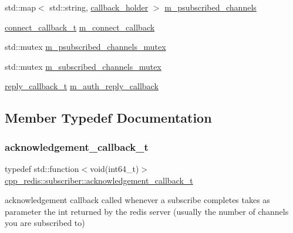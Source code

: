 \begin{DoxyCompactItemize}
\item 
std\+::map$<$ std\+::string, \hyperlink{structcpp__redis_1_1subscriber_1_1callback__holder}{callback\+\_\+holder} $>$ \hyperlink{classcpp__redis_1_1subscriber_a5fa674196428e6f41f808a2f9ff7ec39}{m\+\_\+psubscribed\+\_\+channels}
\item 
\hyperlink{classcpp__redis_1_1subscriber_a90f2f7d4c748c3c2e89d1e977fa6dce1}{connect\+\_\+callback\+\_\+t} \hyperlink{classcpp__redis_1_1subscriber_a39521d60ac80bc449567125e3c509a60}{m\+\_\+connect\+\_\+callback}
\item 
std\+::mutex \hyperlink{classcpp__redis_1_1subscriber_ac2841588b66c32f9cf306672013f3300}{m\+\_\+psubscribed\+\_\+channels\+\_\+mutex}
\item 
std\+::mutex \hyperlink{classcpp__redis_1_1subscriber_ae46b99f9ff06e2a05daca6273ffbb155}{m\+\_\+subscribed\+\_\+channels\+\_\+mutex}
\item 
\hyperlink{classcpp__redis_1_1subscriber_a99d220cc662664e2399b709f61ac9581}{reply\+\_\+callback\+\_\+t} \hyperlink{classcpp__redis_1_1subscriber_a045f1c4e84a7384565deb2d8e7023dfd}{m\+\_\+auth\+\_\+reply\+\_\+callback}
\end{DoxyCompactItemize}


\subsection{Member Typedef Documentation}
\mbox{\label{classcpp__redis_1_1subscriber_a19ea39dfabeb19937a9ce4c8d21781b4}} 
\subsubsection{\texorpdfstring{acknowledgement\+\_\+callback\+\_\+t}{acknowledgement\_callback\_t}}
{\footnotesize\ttfamily typedef std\+::function$<$void(int64\+\_\+t)$>$ \hyperlink{classcpp__redis_1_1subscriber_a19ea39dfabeb19937a9ce4c8d21781b4}{cpp\+\_\+redis\+::subscriber\+::acknowledgement\+\_\+callback\+\_\+t}}

acknowledgement callback called whenever a subscribe completes takes as parameter the int returned by the redis server (usually the number of channels you are subscribed to) \mbox{\label{classcpp__redis_1_1subscriber_a90f2f7d4c748c3c2e89d1e977fa6dce1}} 
